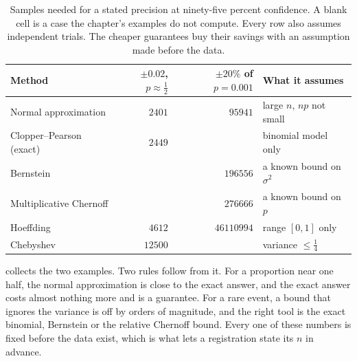 \begin{table}[tbp]
\centering
\small
\begin{tabular}{@{}lrrl@{}}
\toprule
Method & $\pm0.02$, $p\approx\tfrac12$ & $\pm20\%$ of $p=0.001$ & What it assumes \\
\midrule
Normal approximation & $2401$ & $95941$ & large $n$, $np$ not small \\
Clopper--Pearson (exact) & $2449$ & & binomial model only \\
Bernstein & & $196556$ & a known bound on $\sigma^2$ \\
Multiplicative Chernoff & & $276666$ & a known bound on $p$ \\
Hoeffding & $4612$ & $46110994$ & range $[0,1]$ only \\
Chebyshev & $12500$ & & variance $\le\tfrac14$ \\
\bottomrule
\end{tabular}
\caption{Samples needed for a stated precision at ninety-five percent confidence. A blank cell is a case the chapter's examples do not compute. Every row also assumes independent trials. The cheaper guarantees buy their savings with an assumption made before the data.}
\label{tab:ch12:samplesize}
\end{table}

 collects the two examples. Two rules follow from it. For a proportion near one half, the normal approximation is close to the exact answer, and the exact answer costs almost nothing more and is a guarantee. For a rare event, a bound that ignores the variance is off by orders of magnitude, and the right tool is the exact binomial, Bernstein or the relative Chernoff bound. Every one of these numbers is fixed before the data exist, which is what lets a registration state its $n$ in advance.



\let\sectionmark\ompSavedSectionmarkXII
